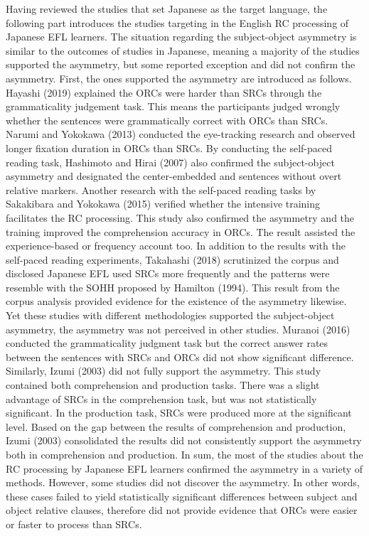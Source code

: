 \documentclass[
]{article}
\begin{document}
Having reviewed the studies that set Japanese as the target language,
the following part introduces the studies targeting in the English RC
processing of Japanese EFL learners. The situation regarding the
subject-object asymmetry is similar to the outcomes of studies in
Japanese, meaning a majority of the studies supported the asymmetry, but
some reported exception and did not confirm the asymmetry. First, the
ones supported the asymmetry are introduced as follows. Hayashi (2019)
explained the ORCs were harder than SRCs through the grammaticality
judgement task. This means the participants judged wrongly whether the
sentences were grammatically correct with ORCs than SRCs. Narumi and
Yokokawa (2013) conducted the eye-tracking research and observed longer
fixation duration in ORCs than SRCs. By conducting the self-paced
reading task, Hashimoto and Hirai (2007) also confirmed the
subject-object asymmetry and designated the center-embedded and
sentences without overt relative markers. Another research with the
self-paced reading tasks by Sakakibara and Yokokawa (2015) verified
whether the intensive training facilitates the RC processing. This study
also confirmed the asymmetry and the training improved the comprehension
accuracy in ORCs. The result assisted the experience-based or frequency
account too. In addition to the results with the self-paced reading
experiments, Takahashi (2018) scrutinized the corpus and disclosed
Japanese EFL used SRCs more frequently and the patterns were resemble
with the SOHH proposed by Hamilton (1994). This result from the corpus
analysis provided evidence for the existence of the asymmetry likewise.
Yet these studies with different methodologies supported the
subject-object asymmetry, the asymmetry was not perceived in other
studies. Muranoi (2016) conducted the grammaticality judgment task but
the correct answer rates between the sentences with SRCs and ORCs did
not show significant difference. Similarly, Izumi (2003) did not fully
support the asymmetry. This study contained both comprehension and
production tasks. There was a slight advantage of SRCs in the
comprehension task, but was not statistically significant. In the
production task, SRCs were produced more at the significant level. Based
on the gap between the results of comprehension and production, Izumi
(2003) consolidated the results did not consistently support the
asymmetry both in comprehension and production. In sum, the most of the
studies about the RC processing by Japanese EFL learners confirmed the
asymmetry in a variety of methods. However, some studies did not
discover the asymmetry. In other words, these cases failed to yield
statistically significant differences between subject and object
relative clauses, therefore did not provide evidence that ORCs were
easier or faster to process than SRCs.
\end{document}
